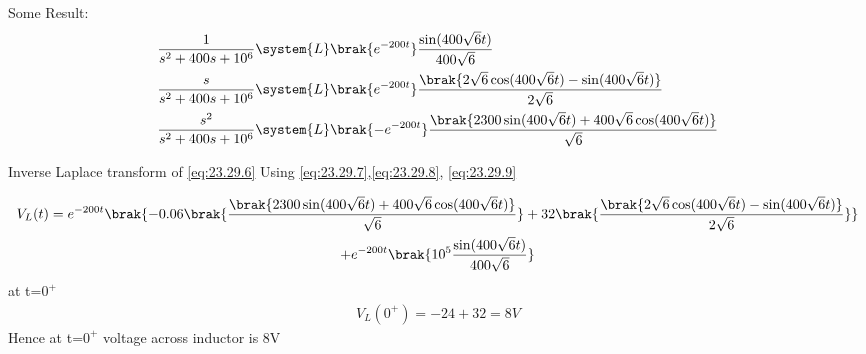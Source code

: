 \documentclass[journal,12pt,twocolumn]{IEEEtran}
\theoremstyle{remark}
\begin{document}
Some Result:
\begin{align}
\frac{1}{s^2+400s+10^6} &\system{L} \brak{e^{-200t}}\frac{\sin(400\sqrt{6}t)}{400\sqrt{6}}
   \label{eq:23.29.7}\\
\frac{s}{s^2+400s+10^6} &\system{L} \brak{e^{-200t}}\frac{\brak{2\sqrt{6}\cos(400\sqrt{6}t)-\sin(400\sqrt{6}t)}}{2\sqrt{6}}
   \label{eq:23.29.8}\\
\frac{s^2}{s^2+400s+10^6} &\system{L} \brak{-e^{-200t}}\frac{\brak{2300\sin(400\sqrt{6}t)+400\sqrt{6}\cos(400\sqrt{6}t)}}{\sqrt{6}}
   \label{eq:23.29.9}
\end{align}

Inverse Laplace transform of \eqref{eq:23.29.6} Using \eqref{eq:23.29.7},\eqref{eq:23.29.8}, \eqref{eq:23.29.9}

\begin{multline}
	V_L(t)=e^{-200t}\brak{-0.06\brak{\frac{\brak{2300\sin(400\sqrt{6}t)+400\sqrt{6}\cos(400\sqrt{6}t)}}{\sqrt{6}}}+32\brak{\frac{\brak{2\sqrt{6}\cos(400\sqrt{6}t)-\sin(400\sqrt{6}t)}}{2\sqrt{6}}}}\\+e^{-200t}\brak{10^5\frac{\sin(400\sqrt{6}t)}{400\sqrt{6}}}
\end{multline}
at t=$0^+$
\begin{align}
    V_L(0^+)= -24+32=8V
\end{align}
Hence at t=$0^+$ voltage across inductor is 8V
\end{document}
